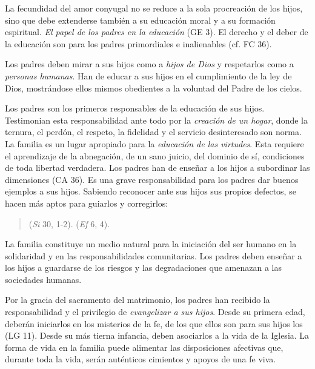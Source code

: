 	
	 La fecundidad del amor conyugal no se reduce a la sola procreación de los hijos, sino que debe extenderse también a su educación moral y a su formación espiritual. \emph{El papel de los padres en la educación}  (GE 3). El derecho y el deber de la educación son para los padres primordiales e inalienables (cf. FC 36).
	
	 Los padres deben mirar a sus hijos como a \emph{hijos de Dios} y respetarlos como a \emph{personas humanas}. Han de educar a sus hijos en el cumplimiento de la ley de Dios, mostrándose ellos mismos obedientes a la voluntad del Padre de los cielos.
	
	 Los padres son los primeros responsables de la educación de sus hijos. Testimonian esta responsabilidad ante todo por la \emph{creación de un hogar}, donde la ternura, el perdón, el respeto, la fidelidad y el servicio desinteresado son norma. La familia es un lugar apropiado para la \emph{educación de las virtudes}. Esta requiere el aprendizaje de la abnegación, de un sano juicio, del dominio de sí, condiciones de toda libertad verdadera. Los padres han de enseñar a los hijos a subordinar las dimensiones  (CA 36). Es una grave responsabilidad para los padres dar buenos ejemplos a sus hijos. Sabiendo reconocer ante sus hijos sus propios defectos, se hacen más aptos para guiarlos y corregirlos:
	
	\begin{quote}
		 (\emph{Si} 30, 1-2).  (\emph{Ef} 6, 4).
	\end{quote}
	

	
	 La familia constituye un medio natural para la iniciación del ser humano en la solidaridad y en las responsabilidades comunitarias. Los padres deben enseñar a los hijos a guardarse de los riesgos y las degradaciones que amenazan a las sociedades humanas.
	
	 Por la gracia del sacramento del matrimonio, los padres han recibido la responsabilidad y el privilegio de \emph{evangelizar a sus hijos}. Desde su primera edad, deberán iniciarlos en los misterios de la fe, de los que ellos son para sus hijos los  (LG 11). Desde su más tierna infancia, deben asociarlos a la vida de la Iglesia. La forma de vida en la familia puede alimentar las disposiciones afectivas que, durante toda la vida, serán auténticos cimientos y apoyos de una fe viva.
	
